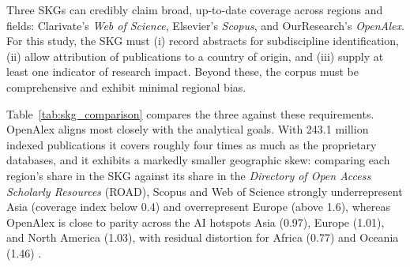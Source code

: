 \documentclass{article}
\let\cite\parencite
\begin{document}
	Three SKGs can credibly claim broad, up-to-date coverage across regions and fields: Clarivate's \textit{Web of Science}, Elsevier's \textit{Scopus}, and OurResearch's \textit{OpenAlex}. For this study, the SKG must (i) record abstracts for subdiscipline identification, (ii) allow attribution of publications to a country of origin, and (iii) supply at least one indicator of research impact. Beyond these, the corpus must be comprehensive and exhibit minimal regional bias.
	
	Table~\ref{tab:skg_comparison} compares the three against these requirements. OpenAlex aligns most closely with the analytical goals. With 243.1 million indexed publications it covers roughly four times as much as the proprietary databases, and it exhibits a markedly smaller geographic skew: comparing each region's share in the SKG against its share in the \textit{Directory of Open Access Scholarly Resources} (ROAD), Scopus and Web of Science strongly underrepresent Asia (coverage index below 0.4) and overrepresent Europe (above 1.6), whereas OpenAlex is close to parity across the AI hotspots Asia (0.97), Europe (1.01), and North America (1.03), with residual distortion for Africa (0.77) and Oceania (1.46) \cite{Maddi2025GeographicalDisciplinaryCoverage}.
	
\end{document}
